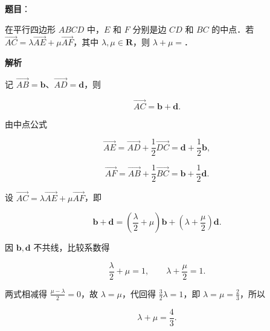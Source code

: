 \begin{answer}

\textbf{题目}：

在平行四边形 $ABCD$ 中，$E$ 和 $F$ 分别是边 $CD$ 和 $BC$ 的中点．若 $\overrightarrow{AC}=\lambda\overrightarrow{AE}+\mu\overrightarrow{AF}$，其中 $\lambda,\mu\in\mathbf R$，则 $\lambda+\mu=$\gkblank{}．

\textbf{解析}

记 $\overrightarrow{AB}=\boldsymbol b$、$\overrightarrow{AD}=\boldsymbol d$，则

\nopagebreak[4]
\[\overrightarrow{AC}=\boldsymbol b+\boldsymbol d .\]

由中点公式

\nopagebreak[4]
\[\overrightarrow{AE}=\overrightarrow{AD}+\frac12\overrightarrow{DC}=\boldsymbol d+\frac12\boldsymbol b,\]

\nopagebreak[4]
\[\overrightarrow{AF}=\overrightarrow{AB}+\frac12\overrightarrow{BC}=\boldsymbol b+\frac12\boldsymbol d .\]

设 $\overrightarrow{AC}=\lambda\overrightarrow{AE}+\mu\overrightarrow{AF}$，即

\nopagebreak[4]
\[\boldsymbol b+\boldsymbol d=\left(\frac\lambda2+\mu\right)\boldsymbol b+\left(\lambda+\frac\mu2\right)\boldsymbol d .\]

因 $\boldsymbol b,\boldsymbol d$ 不共线，比较系数得

\nopagebreak[4]
\[\frac\lambda2+\mu=1,\qquad \lambda+\frac\mu2=1 .\]

两式相减得 $\frac{\mu-\lambda}{2}=0$，故 $\lambda=\mu$，代回得 $\frac32\lambda=1$，即 $\lambda=\mu=\frac23$，所以

\nopagebreak[4]
\[\lambda+\mu=\frac43 .\]


\end{answer}
